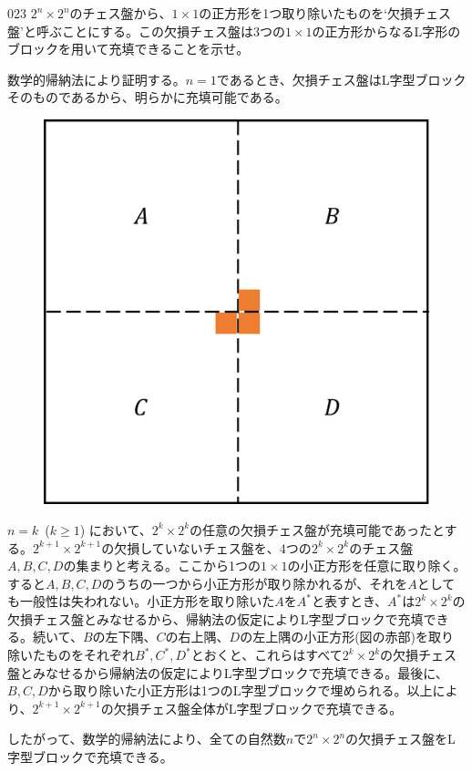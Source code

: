 \begin{thm}{023}{}{}
 $2^n\times2^n$のチェス盤から、$1\times1$の正方形を1つ取り除いたものを`欠損チェス盤'と呼ぶことにする。この欠損チェス盤は3つの$1\times1$の正方形からなるL字形のブロックを用いて充填できることを示せ。
\end{thm}

数学的帰納法により証明する。$n=1$であるとき、欠損チェス盤はL字型ブロックそのものであるから、明らかに充填可能である。

\begin{figure}
 \centering
 \includegraphics[width=\linewidth]{../problems/Q_023/A_023.png}
\end{figure}

$n=k$~($k\ge 1$) において、$2^k\times 2^k$の任意の欠損チェス盤が充填可能であったとする。$2^{k+1}\times 2^{k+1}$の欠損していないチェス盤を、4つの$2^k\times 2^k$のチェス盤$A, B, C, D$の集まりと考える。ここから1つの$1\times 1$の小正方形を任意に取り除く。すると$A, B, C, D$のうちの一つから小正方形が取り除かれるが、それを$A$としても一般性は失われない。小正方形を取り除いた$A$を$A^*$と表すとき、$A^*$は$2^k\times 2^k$の欠損チェス盤とみなせるから、帰納法の仮定によりL字型ブロックで充填できる。続いて、$B$の左下隅、$C$の右上隅、$D$の左上隅の小正方形(図の赤部)を取り除いたものをそれぞれ$B^*, C^*, D^*$とおくと、これらはすべて$2^k\times 2^k$の欠損チェス盤とみなせるから帰納法の仮定によりL字型ブロックで充填できる。最後に、$B, C, D$から取り除いた小正方形は1つのL字型ブロックで埋められる。以上により、$2^{k+1}\times 2^{k+1}$の欠損チェス盤全体がL字型ブロックで充填できる。

したがって、数学的帰納法により、全ての自然数$n$で$2^n\times 2^n$の欠損チェス盤をL字型ブロックで充填できる。